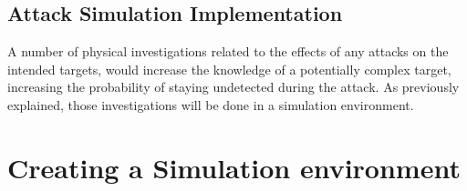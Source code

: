 \subsection{Attack Simulation Implementation}





A number of physical investigations related to the effects of any attacks on the intended targets, would increase the knowledge of a potentially complex target, increasing the probability of staying undetected during the attack. As previously explained, those investigations will be done in a simulation environment.

\section{Creating a Simulation environment}

